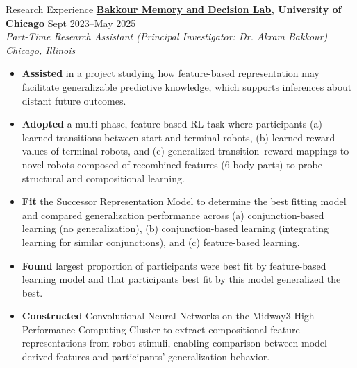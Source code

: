 \documentclass{resume} %
\begin{document}
\begin{rSection}{Research Experience}
\textbf{\href{https://bakkourlab.uchicago.edu/}{Bakkour Memory and Decision Lab}, University of Chicago} \hfill{Sept 2023--May 2025} \\
\textit{Part-Time Research Assistant (Principal Investigator: Dr. Akram Bakkour)} \hfill{\textit{Chicago, Illinois}}
 \begin{itemize}
    \itemsep -5pt {} 
     \item \textbf{Assisted} in a project studying how feature-based representation may facilitate generalizable predictive knowledge, which supports inferences about distant future outcomes. 
     \item \textbf{Adopted} a multi-phase, feature-based RL task where participants (a) learned transitions between start and terminal robots, (b) learned reward values of terminal robots, and (c) generalized transition–reward mappings to novel robots composed of recombined features (6 body parts) to probe structural and compositional learning.
     \item \textbf{Fit} the Successor Representation Model to determine the best fitting model and compared generalization performance across (a) conjunction-based learning (no generalization), (b) conjunction-based learning (integrating learning for similar conjunctions), and (c) feature-based learning.
     \item \textbf{Found} largest proportion of participants were best fit by feature-based learning model and that participants best fit by this model generalized the best. 
     \item \textbf{Constructed} Convolutional Neural Networks on the Midway3 High Performance Computing Cluster to extract compositional feature representations from robot stimuli, enabling comparison between model-derived features and participants' generalization behavior.
 \end{itemize}
 

\end{rSection}
\end{document}
